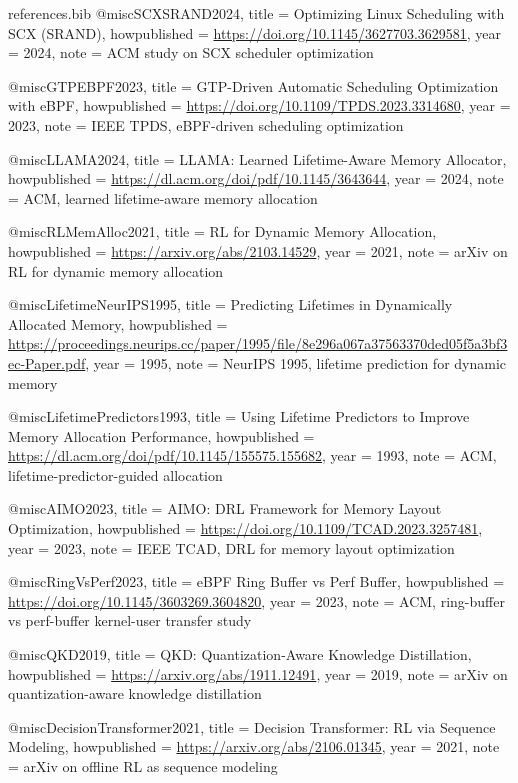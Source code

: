 \begin{filecontents*}{references.bib}
@misc{SCXSRAND2024,
  title = {Optimizing {Linux} Scheduling with {SCX} ({SRAND})},
  howpublished = {\url{https://doi.org/10.1145/3627703.3629581}},
  year = {2024},
  note = {ACM study on SCX scheduler optimization}
}

@misc{GTPEBPF2023,
  title = {{GTP}-Driven Automatic Scheduling Optimization with {eBPF}},
  howpublished = {\url{https://doi.org/10.1109/TPDS.2023.3314680}},
  year = {2023},
  note = {IEEE TPDS, eBPF-driven scheduling optimization}
}

@misc{LLAMA2024,
  title = {{LLAMA}: Learned Lifetime-Aware Memory Allocator},
  howpublished = {\url{https://dl.acm.org/doi/pdf/10.1145/3643644}},
  year = {2024},
  note = {ACM, learned lifetime-aware memory allocation}
}

@misc{RLMemAlloc2021,
  title = {{RL} for Dynamic Memory Allocation},
  howpublished = {\url{https://arxiv.org/abs/2103.14529}},
  year = {2021},
  note = {arXiv on RL for dynamic memory allocation}
}

@misc{LifetimeNeurIPS1995,
  title = {Predicting Lifetimes in Dynamically Allocated Memory},
  howpublished = {\url{https://proceedings.neurips.cc/paper/1995/file/8e296a067a37563370ded05f5a3bf3ec-Paper.pdf}},
  year = {1995},
  note = {NeurIPS 1995, lifetime prediction for dynamic memory}
}

@misc{LifetimePredictors1993,
  title = {Using Lifetime Predictors to Improve Memory Allocation Performance},
  howpublished = {\url{https://dl.acm.org/doi/pdf/10.1145/155575.155682}},
  year = {1993},
  note = {ACM, lifetime-predictor-guided allocation}
}

@misc{AIMO2023,
  title = {{AIMO}: {DRL} Framework for Memory Layout Optimization},
  howpublished = {\url{https://doi.org/10.1109/TCAD.2023.3257481}},
  year = {2023},
  note = {IEEE TCAD, DRL for memory layout optimization}
}

@misc{RingVsPerf2023,
  title = {{eBPF} Ring Buffer vs Perf Buffer},
  howpublished = {\url{https://doi.org/10.1145/3603269.3604820}},
  year = {2023},
  note = {ACM, ring-buffer vs perf-buffer kernel-user transfer study}
}

@misc{QKD2019,
  title = {{QKD}: Quantization-Aware Knowledge Distillation},
  howpublished = {\url{https://arxiv.org/abs/1911.12491}},
  year = {2019},
  note = {arXiv on quantization-aware knowledge distillation}
}

@misc{DecisionTransformer2021,
  title = {Decision Transformer: {RL} via Sequence Modeling},
  howpublished = {\url{https://arxiv.org/abs/2106.01345}},
  year = {2021},
  note = {arXiv on offline RL as sequence modeling}
}


\end{filecontents*}
